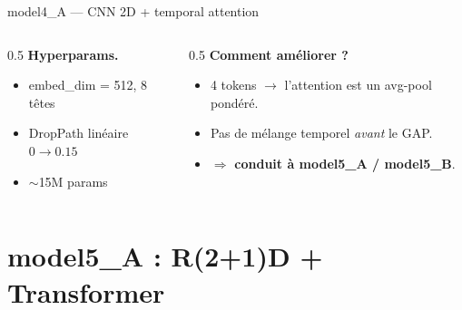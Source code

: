 \documentclass[10pt,aspectratio=169]{beamer}
\newcommand{\hl}[1]{\textcolor{accent}{\textbf{#1}}}
\begin{document}
\begin{frame}{model4\_A --- CNN 2D + temporal attention}
  \medskip
  \begin{columns}
    \begin{column}{0.5\textwidth}
      \footnotesize
      \textbf{Hyperparams.}
      \begin{itemize}
        \item embed\_dim = 512, 8 têtes
        \item DropPath linéaire $0 \to 0.15$
        \item $\sim$15M params
      \end{itemize}
    \end{column}
    \begin{column}{0.5\textwidth}
      \footnotesize
      \textbf{Comment améliorer ?}
      \begin{itemize}
        \item 4 tokens $\to$ l'attention est un avg-pool pondéré.
        \item Pas de mélange temporel \emph{avant} le GAP.
        \item $\Rightarrow$ \hl{conduit à model5\_A / model5\_B}.
      \end{itemize}
    \end{column}
  \end{columns}
\end{frame}

\section{model5\_A : R(2+1)D + Transformer}
\end{document}
